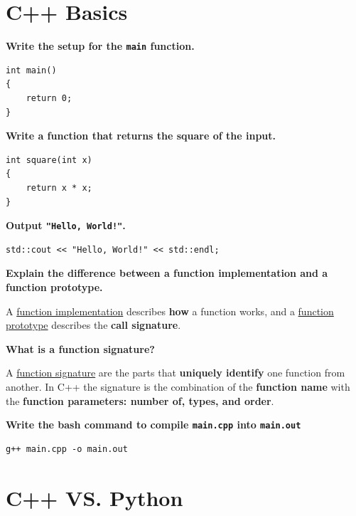 \documentclass[letterpaper, 12pt]{article}
\newcommand{\question}[2][2em]{\textbf{#2}\vspace{#1}\par}
\newenvironment{ansblock}{\color{Green4}}{\normalcolor\vspace{1em}}
\begin{document}
\pagebreak

\section{C++ Basics}

\question[0em]{Write the setup for the \texttt{main} function.}

\begin{verbatim}
int main()
{
    return 0;
}
\end{verbatim}

\question[0em]{Write a function that returns the square of the input.}

\begin{verbatim}
int square(int x)
{
    return x * x;
}
\end{verbatim}

\question[0em]{Output \texttt{"Hello, World!"}.}

\begin{verbatim}
std::cout << "Hello, World!" << std::endl;
\end{verbatim}

\question[0em]{Explain the difference between a function implementation and a
    function prototype.}
\begin{ansblock}
A \uline{function implementation} describes \textbf{how} a function works,
and a \uline{function prototype} describes the \textbf{call signature}.
\end{ansblock}

\question[0em]{What is a function signature?}
\begin{ansblock}
A \uline{function signature} are the parts that \textbf{uniquely identify}
one function from another. In C++ the signature is the combination of the
\textbf{function name} with the
\textbf{function parameters: number of, types, and order}.
\end{ansblock}

\question[0em]{Write the bash command to compile \texttt{main.cpp} into \texttt{main.out}}
\begin{verbatim}
g++ main.cpp -o main.out
\end{verbatim}

\section{C++ VS. Python}
\end{document}
